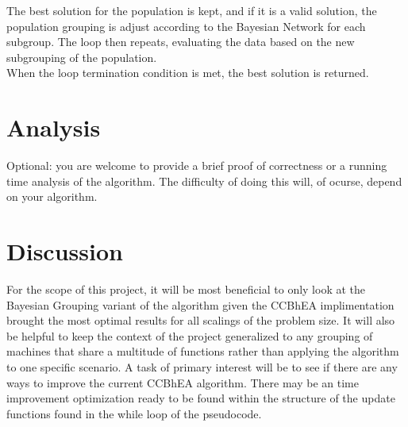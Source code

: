 \documentclass[11pt]{article}
\begin{document}
The best solution for the population is kept, and if it is a valid solution, the population grouping is adjust according to the Bayesian Network for each subgroup. The loop then repeats, evaluating the data based on the new subgrouping of the population.\\

When the loop termination condition is met, the best solution is returned.





\section{Analysis}
Optional: you are welcome to provide a brief proof of correctness or a 
running time analysis of the algorithm.  The difficulty of doing this will, of 
ocurse, depend on your algorithm.

\section{Discussion}
For the scope of this project, it will be most beneficial to only look at the Bayesian Grouping variant of the algorithm given the CCBhEA implimentation brought the most optimal results for all scalings of the problem size. It will also be helpful to keep the context of the project generalized to any grouping of machines that share a multitude of functions rather than applying the algorithm to one specific scenario. A task of primary interest will be to see if there are any ways to improve the current CCBhEA algorithm. There may be an time improvement optimization ready to be found within the structure of the update functions found in the while loop of the pseudocode.
\end{document}

